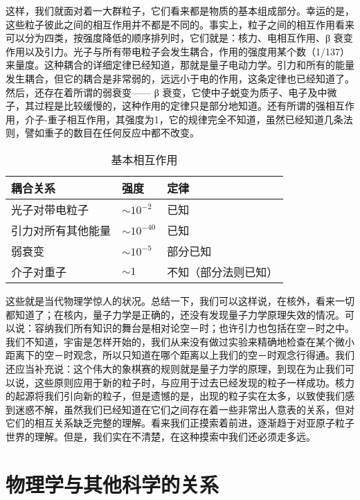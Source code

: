 \documentclass[11pt,oneside]{book}
\begin{document}
\begin{common-format}
这样，我们就面对着一大群粒子，它们看来都是物质的基本组成部分。幸运的是，这些粒子彼此之间的相互作用并不都是不同的。事实上，粒子之间的相互作用看来可以分为四类，按强度降低的顺序排列时，它们就是：核力、电相互作用、β 衰变作用以及引力。光子与所有带电粒子会发生耦合，作用的强度用某个数（1/137）来量度。这种耦合的详细定律已经知道，那就是量子电动力学。引力和所有的能量发生耦合，但它的耦合是非常弱的，远远小于电的作用，这条定律也已经知道了。然后，还存在着所谓的弱衰变—— β 衰变，它使中子蜕变为质子、电子及中微子，其过程是比较缓慢的，这种作用的定律只是部分地知道。还有所谓的强相互作用，介子-重子相互作用，其强度为1，它的规律完全不知道，虽然已经知道几条法则，譬如重子的数目在任何反应中都不改变。
\begin{table}[H]
\centering
\label{tab:基本相互作用}
\caption{基本相互作用}
\medskip 
\begin{tabular}{@{}lll@{}}
\toprule
耦合关系      & 强度             & 定律         \\ \midrule
光子对带电粒子   & $\sim10^{-2}$  & 已知         \\
引力对所有其他能量 & $\sim10^{-40}$ & 已知         \\
弱衰变       & $\sim10^{-5}$  & 部分已知       \\
介子对重子     & $\sim1$        & 不知（部分法则已知） \\ \bottomrule
\end{tabular}
\end{table}

这些就是当代物理学惊人的状况。总结一下，我们可以这样说，在核外，看来一切都知道了；在核内，量子力学是正确的，还没有发现量子力学原理失效的情况。可以说：容纳我们所有知识的舞台是相对论空－时；也许引力也包括在空－时之中。我们不知道，宇宙是怎样开始的，我们从来没有做过实验来精确地检查在某个微小距离下的空－时观念，所以只知道在哪个距离以上我们的空－时观念行得通。我们还应当补充说：这个伟大的象棋赛的规则就是量子力学的原理，到现在为止我们可以说，这些原则应用于新的粒子时，与应用于过去已经发现的粒子一样成功。核力的起源将我们引向新的粒子，但是遗憾的是，出现的粒子实在太多，以致使我们感到迷惑不解，虽然我们已经知道在它们之间存在着一些非常出人意表的关系，但对它们的相互关系缺乏完整的理解。看来我们正摸索着前进，逐渐趋于对亚原子粒子世界的理解。但是，我们实在不清楚，在这种摸索中我们还必须走多远。


\chapter{物理学与其他科学的关系}

\end{common-format}
\end{document}
